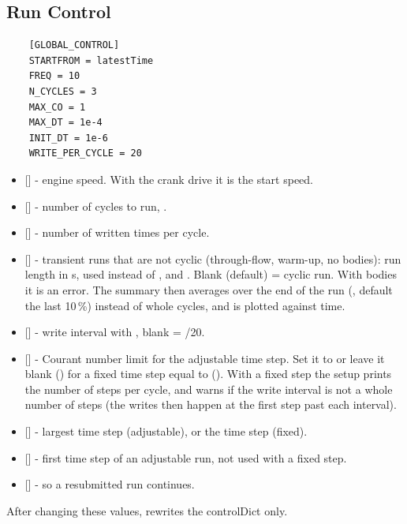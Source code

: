 \subsection{Run Control}
\begin{lstlisting}
    [GLOBAL_CONTROL]
    STARTFROM = latestTime
    FREQ = 10
    N_CYCLES = 3
    MAX_CO = 1
    MAX_DT = 1e-4
    INIT_DT = 1e-6
    WRITE_PER_CYCLE = 20
\end{lstlisting}
\begin{itemize}
    \item {} [] - engine speed. With the crank drive it is the start speed.
    \item {} [] - number of cycles to run, .
    \item {} [] - number of written times per cycle.
    \item {} [] - transient runs that are not cyclic (through-flow, warm-up, no  bodies): run length in s, used instead of ,  and . Blank (default) = cyclic run. With  bodies it is an error. The summary then averages over the end of the run (, default the last 10\,\%) instead of whole cycles, and  is plotted against time.
    \item {} [] - write interval with , blank = /20.
    \item {} [] - Courant number limit for the adjustable time step. Set it to  or leave it blank () for a fixed time step equal to  (). With a fixed step the setup prints the number of steps per cycle, and warns if the write interval is not a whole number of steps (the writes then happen at the first step past each interval).
    \item {} [] - largest time step (adjustable), or the time step (fixed).
    \item {} [] - first time step of an adjustable run, not used with a fixed step.
    \item {} [] -  so a resubmitted run continues.
\end{itemize}
After changing these values,  rewrites the controlDict only.

